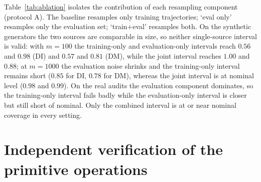 \documentclass[11pt]{article}
\begin{document}
Table~\ref{tab:ablation} isolates the contribution of each resampling component
(protocol A).  The baseline resamples only training trajectories; `eval only' resamples only
the evaluation set; `train+eval' resamples both.  On the synthetic generators the two sources are
comparable in size, so neither single-source interval is valid: with $m=100$ the training-only and
evaluation-only intervals reach $0.56$ and $0.98$ (DI) and $0.57$ and $0.81$ (DM), while the joint
interval reaches $1.00$ and $0.88$; at $m=1000$ the evaluation noise shrinks and the training-only
interval remains short ($0.85$ for DI, $0.78$ for DM), whereas the joint interval is at nominal
level ($0.98$ and $0.99$).  On the real audits the evaluation component dominates, so the
training-only interval fails badly while the evaluation-only interval is closer but still short of
nominal.  Only the combined interval is at or near nominal coverage in every setting.

\begin{table}[h]
\centering
\small
\caption{Source ablation, protocol A, nominal 0.95 (results/tables/ablation_*.json).}
\label{tab:ablation}
\end{table}

\section{Independent verification of the primitive operations}
\end{document}
